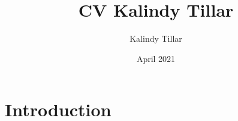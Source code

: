 \documentclass{article}
\title{CV Kalindy Tillar}
\author{Kalindy Tillar}
\date{April 2021}
\begin{document}
\maketitle

\section{Introduction}
\end{document}
